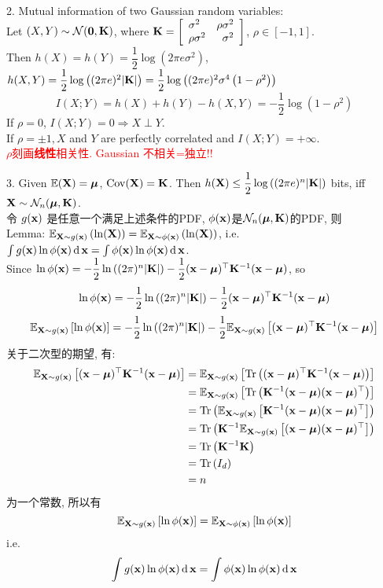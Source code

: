 2. Mutual information of two Gaussian random variables: \\
Let $(X,Y)\sim\mathcal{N}(\mathbf{0},\mathbf{K})$, where $\mathbf{K}=\left[\begin{array}{lr}\sigma^2 & \rho \sigma^2 \\ \rho \sigma^2 & \sigma^2 \end{array}\right]$, $\rho\in[-1,1]$. \\
Then $h(X)=h(Y)=\dfrac{1}{2} \log \left(2 \pi e \sigma^2\right)$, $h(X, Y)=\dfrac{1}{2} \log \left((2 \pi e)^2|\mathbf{K}|\right) = \dfrac{1}{2} \log \left((2 \pi e)^2 \sigma^4\left(1-\rho^2\right) \right)$
$$I(X ; Y)=h(X)+h(Y)-h(X, Y)=-\dfrac{1}{2} \log \left(1-\rho^2\right)$$
If $\rho=0$, $I(X;Y)=0\Rightarrow X\perp Y$. \\
If $\rho= \pm 1, X$ and $Y$ are perfectly correlated and $I(X;Y)=+\infty$. \\
\textcolor{red}{$\rho$刻画\textbf{线性}相关性. Gaussian 不相关=独立!!}

3. Given $\mathbb{E}(\mathbf{X})=\bm{\mu}$, $\operatorname{Cov}(\mathbf{X})=\mathbf{K}$. Then $h(\mathbf{X}) \leq \dfrac{1}{2}\log\left((2\pi e)^n|\mathbf{K}|\right)$ bits, iff $\mathbf{X}\sim\mathcal{N}_n(\bm{\mu},\mathbf{K})$. \\
令 $g(\mathbf{x})$ 是任意一个满足上述条件的PDF, $\phi(\mathbf{x})$是$\mathcal{N}_n(\bm{\mu},\mathbf{K})$的PDF, 则 \\
Lemma: $\mathbb{E}_{\mathbf{X}\sim g(\mathbf{x})}\left(\ln (\mathbf{X})\right)=\mathbb{E}_{\mathbf{X}\sim \phi(\mathbf{x})}\left(\ln (\mathbf{X})\right)$, i.e. $\int g(\mathbf{x})\ln \phi(\mathbf{x})\operatorname{d}\mathbf{x}=\int \phi(\mathbf{x})\ln \phi(\mathbf{x})\operatorname{d}\mathbf{x}$. \\
Since $\ln \phi(\mathbf{x}) = -\dfrac{1}{2} \ln \left((2\pi)^n|\mathbf{K}| \right) - \dfrac{1}{2} (\mathbf{x} - \bm{\mu})^{\top} \mathbf{K}^{-1} (\mathbf{x} - \bm{\mu})$, so
$$\ln \phi(\mathbf{x}) = -\dfrac{1}{2} \ln \left((2\pi)^n|\mathbf{K}| \right) - \dfrac{1}{2} (\mathbf{x} - \bm{\mu})^{\top} \mathbf{K}^{-1} (\mathbf{x} - \bm{\mu})$$
$$\mathbb{E}_{\mathbf{X}\sim g(\mathbf{x})}\left[ \ln \phi(\mathbf{x}) \right] = -\dfrac{1}{2} \ln \left((2\pi)^n|\mathbf{K}| \right) - \dfrac{1}{2} \mathbb{E}_{\mathbf{X}\sim g(\mathbf{x})}\left[ (\mathbf{x} - \bm{\mu})^{\top} \mathbf{K}^{-1} (\mathbf{x} - \bm{\mu}) \right]$$
关于二次型的期望, 有:
\begin{align*}
\mathbb{E}_{\mathbf{X}\sim g(\mathbf{x})}\left[ (\mathbf{x} - \bm{\mu})^{\top} \mathbf{K}^{-1} (\mathbf{x} - \bm{\mu}) \right] &= \mathbb{E}_{\mathbf{X}\sim g(\mathbf{x})}\left[ \text{Tr}\left((\mathbf{x} - \bm{\mu})^{\top} \mathbf{K}^{-1} (\mathbf{x} - \bm{\mu})\right) \right] \\
&= \mathbb{E}_{\mathbf{X}\sim g(\mathbf{x})}\left[ \text{Tr}\left( \mathbf{K}^{-1} (\mathbf{x} - \bm{\mu})(\mathbf{x} - \bm{\mu})^{\top} \right) \right] \\
&= \text{Tr}\left(\mathbb{E}_{\mathbf{X}\sim g(\mathbf{x})}\left[\mathbf{K}^{-1} (\mathbf{x} - \bm{\mu})(\mathbf{x} - \bm{\mu})^{\top}\right] \right) \\
&= \text{Tr}\left(\mathbf{K}^{-1}\mathbb{E}_{\mathbf{X}\sim g(\mathbf{x})}\left[ (\mathbf{x} - \bm{\mu})(\mathbf{x} - \bm{\mu})^{\top}\right] \right) \\
&= \text{Tr}\left(\mathbf{K}^{-1}\mathbf{K} \right) \\
&= \text{Tr}\left(I_d \right) \\
&= n
\end{align*}
为一个常数, 所以有
$$\mathbb{E}_{\mathbf{X}\sim g(\mathbf{x})}\left[ \ln \phi(\mathbf{x}) \right] = \mathbb{E}_{\mathbf{X}\sim \phi(\mathbf{x})}\left[ \ln \phi(\mathbf{x}) \right]$$
i.e.
$$\int g(\mathbf{x})\ln \phi(\mathbf{x})\operatorname{d}\mathbf{x}=\int \phi(\mathbf{x})\ln \phi(\mathbf{x})\operatorname{d}\mathbf{x}$$

